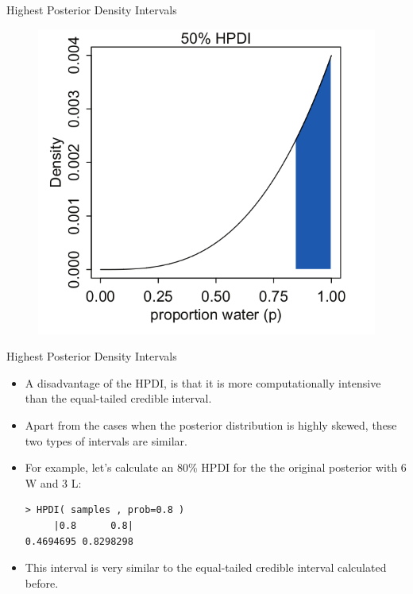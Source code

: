 \documentclass[handout]{beamer}
\begin{document}
\begin{frame}{Highest Posterior Density Intervals}
\scriptsize{

   \begin{figure}[h!]
	\centering
	\includegraphics[scale=0.4]{pics/interval6.png}
	\end{figure} 




} 
\end{frame}


\begin{frame}[fragile]{Highest Posterior Density Intervals}
\scriptsize{
\begin{itemize}

\item A disadvantage of the HPDI, is that it is more computationally intensive than the equal-tailed credible interval.

\item Apart from the cases when the posterior distribution is highly skewed, these two types of intervals are similar.

\item For example, let's calculate an 80\% HPDI for the the original posterior with 6 W and 3 L:

\begin{verbatim}
> HPDI( samples , prob=0.8 )
     |0.8      0.8| 
0.4694695 0.8298298  
\end{verbatim}

\item This interval is very similar to the equal-tailed credible interval calculated before.


\end{itemize}



} 

\end{frame}
\end{document}
